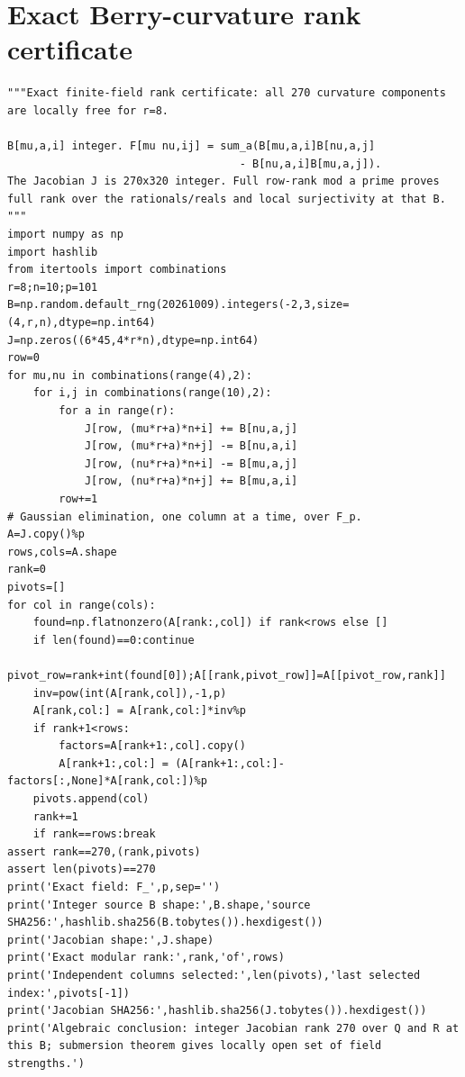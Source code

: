 \documentclass[11pt,oneside]{report}
\begin{document}
\section{Exact Berry-curvature rank certificate}
\noindent{}\par
\begin{Verbatim}[breaklines=true,breakanywhere=true,fontsize=\scriptsize]
"""Exact finite-field rank certificate: all 270 curvature components are locally free for r=8.

B[mu,a,i] integer. F[mu nu,ij] = sum_a(B[mu,a,i]B[nu,a,j]
                                    - B[nu,a,i]B[mu,a,j]).
The Jacobian J is 270x320 integer. Full row-rank mod a prime proves
full rank over the rationals/reals and local surjectivity at that B.
"""
import numpy as np
import hashlib
from itertools import combinations
r=8;n=10;p=101
B=np.random.default_rng(20261009).integers(-2,3,size=(4,r,n),dtype=np.int64)
J=np.zeros((6*45,4*r*n),dtype=np.int64)
row=0
for mu,nu in combinations(range(4),2):
    for i,j in combinations(range(10),2):
        for a in range(r):
            J[row, (mu*r+a)*n+i] += B[nu,a,j]
            J[row, (mu*r+a)*n+j] -= B[nu,a,i]
            J[row, (nu*r+a)*n+i] -= B[mu,a,j]
            J[row, (nu*r+a)*n+j] += B[mu,a,i]
        row+=1
# Gaussian elimination, one column at a time, over F_p.
A=J.copy()%p
rows,cols=A.shape
rank=0
pivots=[]
for col in range(cols):
    found=np.flatnonzero(A[rank:,col]) if rank<rows else []
    if len(found)==0:continue
    pivot_row=rank+int(found[0]);A[[rank,pivot_row]]=A[[pivot_row,rank]]
    inv=pow(int(A[rank,col]),-1,p)
    A[rank,col:] = A[rank,col:]*inv%p
    if rank+1<rows:
        factors=A[rank+1:,col].copy()
        A[rank+1:,col:] = (A[rank+1:,col:]-factors[:,None]*A[rank,col:])%p
    pivots.append(col)
    rank+=1
    if rank==rows:break
assert rank==270,(rank,pivots)
assert len(pivots)==270
print('Exact field: F_',p,sep='')
print('Integer source B shape:',B.shape,'source SHA256:',hashlib.sha256(B.tobytes()).hexdigest())
print('Jacobian shape:',J.shape)
print('Exact modular rank:',rank,'of',rows)
print('Independent columns selected:',len(pivots),'last selected index:',pivots[-1])
print('Jacobian SHA256:',hashlib.sha256(J.tobytes()).hexdigest())
print('Algebraic conclusion: integer Jacobian rank 270 over Q and R at this B; submersion theorem gives locally open set of field strengths.')

\end{Verbatim}
\end{document}
